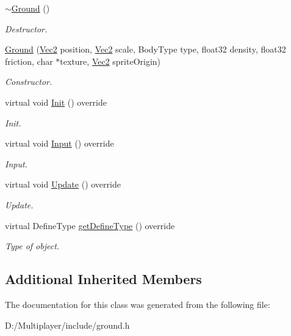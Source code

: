 \begin{DoxyCompactItemize}
\item 
\mbox{\label{class_ground_ad39c80052f8357c29b364384c3488e4e}} 
\hyperlink{class_ground_ad39c80052f8357c29b364384c3488e4e}{$\sim$\+Ground} ()
\begin{DoxyCompactList}\small\item\em Destructor. \end{DoxyCompactList}\item 
\mbox{\label{class_ground_a8710ce641b9a630ebae69637159e2354}} 
\hyperlink{class_ground_a8710ce641b9a630ebae69637159e2354}{Ground} (\hyperlink{struct_vec2}{Vec2} position, \hyperlink{struct_vec2}{Vec2} scale, Body\+Type type, float32 density, float32 friction, char $\ast$texture, \hyperlink{struct_vec2}{Vec2} sprite\+Origin)
\begin{DoxyCompactList}\small\item\em Constructor. \end{DoxyCompactList}\item 
\mbox{\label{class_ground_af3203f3fd7dce00c7c69736e46d555c1}} 
virtual void \hyperlink{class_ground_af3203f3fd7dce00c7c69736e46d555c1}{Init} () override
\begin{DoxyCompactList}\small\item\em Init. \end{DoxyCompactList}\item 
\mbox{\label{class_ground_a862cf7a6d242ab2380125c24c86b3776}} 
virtual void \hyperlink{class_ground_a862cf7a6d242ab2380125c24c86b3776}{Input} () override
\begin{DoxyCompactList}\small\item\em Input. \end{DoxyCompactList}\item 
\mbox{\label{class_ground_a75d1be9fc439e7f8cb6193abfcef2da5}} 
virtual void \hyperlink{class_ground_a75d1be9fc439e7f8cb6193abfcef2da5}{Update} () override
\begin{DoxyCompactList}\small\item\em Update. \end{DoxyCompactList}\item 
\mbox{\label{class_ground_a90acab6f237d91fea1e5ff1558dc5365}} 
virtual Define\+Type \hyperlink{class_ground_a90acab6f237d91fea1e5ff1558dc5365}{get\+Define\+Type} () override
\begin{DoxyCompactList}\small\item\em Type of object. \end{DoxyCompactList}\end{DoxyCompactItemize}
\subsection*{Additional Inherited Members}


The documentation for this class was generated from the following file\+:\begin{DoxyCompactItemize}
\item 
D\+:/\+Multiplayer/include/ground.\+h\end{DoxyCompactItemize}
